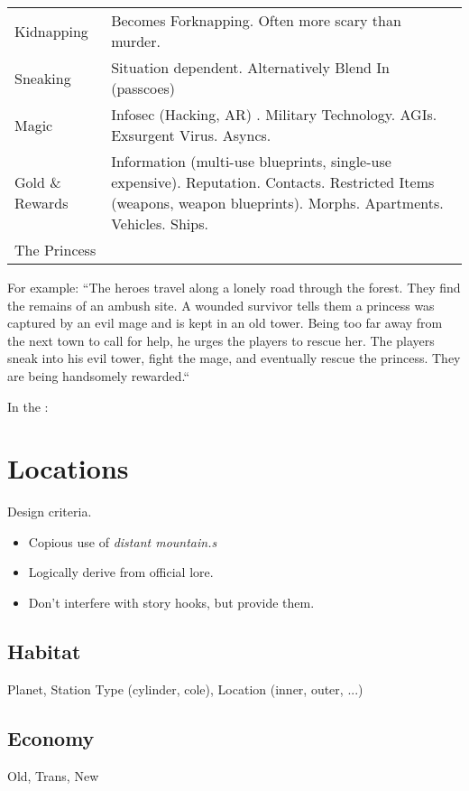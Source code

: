 \documentclass[a4]{article}
\begin{document}
\begin{xtabular}{|p{.35\columnwidth}|p{.55\columnwidth}|}
    Kidnapping & Becomes Forknapping. Often more scary than murder. \\
    Sneaking & Situation dependent. Alternatively Blend In (passcoes)  \\
    Magic & Infosec (Hacking, AR) . Military Technology. AGIs. Exsurgent Virus. Asyncs. \\
    Gold \& Rewards & Information (multi-use blueprints, single-use expensive). Reputation. Contacts. Restricted Items (weapons, weapon blueprints). Morphs. Apartments. Vehicles. Ships.\\
    The Princess &  \\
\end{xtabular}%

\medskip


For example:
``The heroes travel along a lonely road through the forest.
They find the remains of an ambush site.
A wounded survivor tells them a princess was captured by an evil mage and is kept in an old tower.
Being too far away from the next town to call for help, he urges the players to rescue her.
The players sneak into his evil tower, fight the mage, and eventually rescue the princess.
They are being handsomely rewarded.``

In the \eclipsephase:



\section{Locations}

Design criteria.

\begin{itemize}
    \item Copious use of \textit{distant mountain.s}
    \item Logically derive from official \eclipsephase lore.
    \item Don't interfere with story hooks, but provide them.
\end{itemize}

\subsection{Habitat} Planet, Station Type (cylinder, cole), Location (inner, outer, ...)
\subsection{Economy} Old, Trans, New
\end{document}
